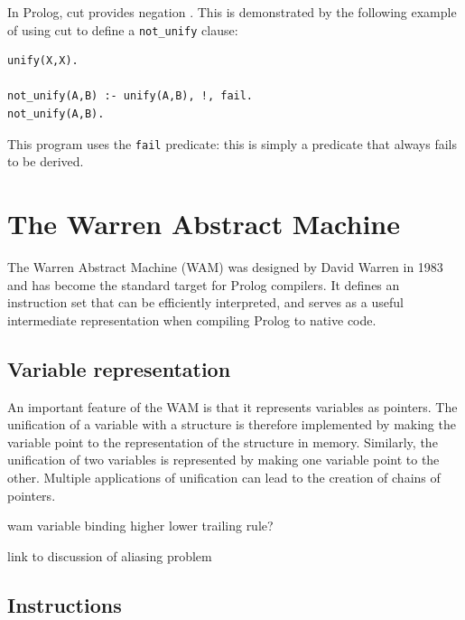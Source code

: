 \documentclass[12pt,a4paper]{report}
\begin{document}
In Prolog, cut provides negation . This is demonstrated by the following example of using cut to define a \texttt{not\_unify} clause:
\begin{lstlisting}
unify(X,X).

not_unify(A,B) :- unify(A,B), !, fail.
not_unify(A,B).
\end{lstlisting}
This program uses the \texttt{fail} predicate: this is simply a predicate that always fails to be derived.

\section{The Warren Abstract Machine}


The Warren Abstract Machine (WAM) was designed by David Warren in 1983 \cite{WAM} and has become the standard target for Prolog compilers. It defines an instruction set that can be efficiently interpreted, and serves as a useful intermediate representation when compiling Prolog to native code. 

\subsection{Variable representation}

An important feature of the WAM is that it represents variables as pointers. The unification of a variable with a structure is therefore implemented by making the variable point to the representation of the structure in memory. Similarly, the unification of two variables is represented by making one variable point to the other. Multiple applications of unification can lead to the creation of chains of pointers.

{\color{red} wam variable binding higher lower trailing rule?}

{\color{red} link to discussion of aliasing problem}

\subsection{Instructions}
\end{document}
